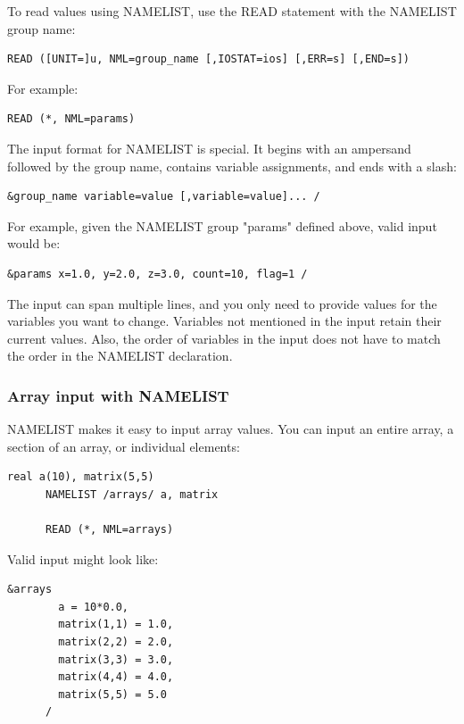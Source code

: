 To read values using NAMELIST, use the READ statement with the NAMELIST group name:

\begin{lstlisting}[style=fortran77]
      READ ([UNIT=]u, NML=group_name [,IOSTAT=ios] [,ERR=s] [,END=s])
\end{lstlisting}

For example:

\begin{lstlisting}[style=fortran77]
      READ (*, NML=params)
\end{lstlisting}

The input format for NAMELIST is special. It begins with an ampersand followed by the group name, contains variable assignments, and ends with a slash:

\begin{lstlisting}[style=fortran77]
      &group_name variable=value [,variable=value]... /
\end{lstlisting}

For example, given the NAMELIST group "params" defined above, valid input would be:

\begin{lstlisting}[style=fortran77]
      &params x=1.0, y=2.0, z=3.0, count=10, flag=1 /
\end{lstlisting}

The input can span multiple lines, and you only need to provide values for the variables you want to change. Variables not mentioned in the input retain their current values. Also, the order of variables in the input does not have to match the order in the NAMELIST declaration.

\subsubsection{Array input with NAMELIST}

NAMELIST makes it easy to input array values. You can input an entire array, a section of an array, or individual elements:

\begin{lstlisting}[style=fortran77]
      real a(10), matrix(5,5)
      NAMELIST /arrays/ a, matrix
      
      READ (*, NML=arrays)
\end{lstlisting}

Valid input might look like:

\begin{lstlisting}[style=fortran77]
      &arrays 
        a = 10*0.0,
        matrix(1,1) = 1.0,
        matrix(2,2) = 2.0,
        matrix(3,3) = 3.0,
        matrix(4,4) = 4.0,
        matrix(5,5) = 5.0
      /
\end{lstlisting}

